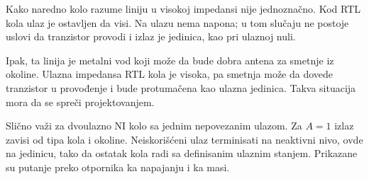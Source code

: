 Kako naredno kolo razume liniju u visokoj impedansi nije jednoznačno. Kod RTL kola ulaz je ostavljen da visi. Na ulazu nema napona; u tom slučaju ne postoje uslovi da tranzistor provodi i izlaz je jedinica, kao pri ulaznoj nuli.

Ipak, ta linija je metalni vod koji može da bude dobra antena za smetnje iz okoline. Ulazna impedansa RTL kola je visoka, pa smetnja može da dovede tranzistor u provođenje i bude protumačena kao ulazna jedinica. Takva situacija mora da se spreči projektovanjem.

Slično važi za dvoulazno NI kolo sa jednim nepovezanim ulazom. Za $A=1$ izlaz zavisi od tipa kola i okoline. Neiskorišćeni ulaz terminisati na neaktivni nivo, ovde na jedinicu, tako da ostatak kola radi sa definisanim ulaznim stanjem. Prikazane su putanje preko otpornika ka napajanju i ka masi.
